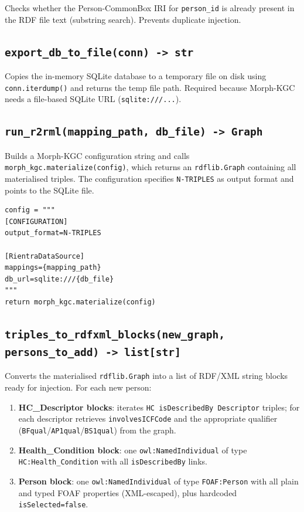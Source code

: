 ﻿\documentclass[12pt,a4paper]{article}
\begin{document}
Checks whether the Person-CommonBox IRI for \texttt{person\_id} is already present in the RDF file text (substring search). Prevents duplicate injection.

\subsection{\texttt{export\_db\_to\_file(conn) -> str}}

Copies the in-memory SQLite database to a temporary file on disk using \texttt{conn.iterdump()} and returns the temp file path. Required because Morph-KGC needs a file-based SQLite URL (\texttt{sqlite:///...}).

\subsection{\texttt{run\_r2rml(mapping\_path, db\_file) -> Graph}}

Builds a Morph-KGC configuration string and calls \texttt{morph\_kgc.materialize(config)}, which returns an \texttt{rdflib.Graph} containing all materialised triples. The configuration specifies \texttt{N-TRIPLES} as output format and points to the SQLite file.

\begin{lstlisting}
config = """
[CONFIGURATION]
output_format=N-TRIPLES

[RientraDataSource]
mappings={mapping_path}
db_url=sqlite:///{db_file}
"""
return morph_kgc.materialize(config)
\end{lstlisting}

\subsection{\texttt{triples\_to\_rdfxml\_blocks(new\_graph, persons\_to\_add) -> list[str]}}

Converts the materialised \texttt{rdflib.Graph} into a list of RDF/XML string blocks ready for injection. For each new person:

\begin{enumerate}[noitemsep]
  \item \textbf{HC\_Descriptor blocks}: iterates \texttt{HC isDescribedBy Descriptor} triples; for each descriptor retrieves \texttt{involvesICFCode} and the appropriate qualifier (\texttt{BFqual}/\texttt{AP1qual}/\texttt{BS1qual}) from the graph.
  \item \textbf{Health\_Condition block}: one \texttt{owl:NamedIndividual} of type \texttt{HC:Health\_Condition} with all \texttt{isDescribedBy} links.
  \item \textbf{Person block}: one \texttt{owl:NamedIndividual} of type \texttt{FOAF:Person} with all plain and typed FOAF properties (XML-escaped), plus hardcoded \texttt{isSelected=false}.
\end{enumerate}
\end{document}

